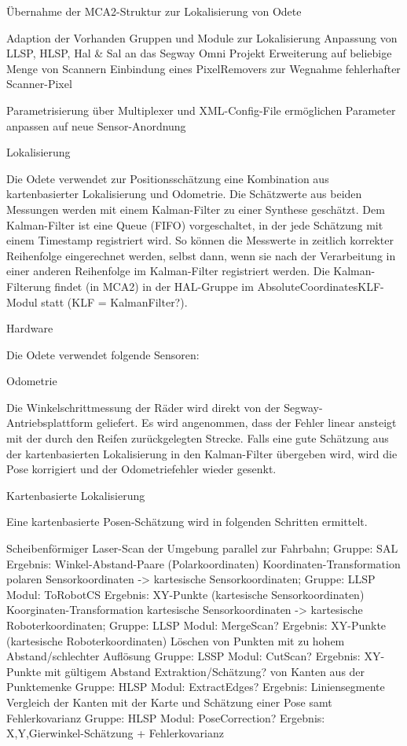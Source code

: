 Übernahme der MCA2-Struktur zur Lokalisierung von Odete

Adaption der Vorhanden Gruppen und Module zur Lokalisierung 
Anpassung von LLSP, HLSP, Hal \& Sal an das Segway Omni Projekt
Erweiterung auf beliebige Menge von Scannern
Einbindung eines PixelRemovers zur Wegnahme fehlerhafter Scanner-Pixel


Parametrisierung über Multiplexer und XML-Config-File ermöglichen
Parameter anpassen auf neue Sensor-Anordnung

Lokalisierung

Die Odete verwendet zur Positionsschätzung eine Kombination aus kartenbasierter Lokalisierung und Odometrie.
 Die Schätzwerte aus beiden Messungen werden mit einem Kalman-Filter zu einer Synthese geschätzt.
 Dem Kalman-Filter ist eine Queue (FIFO) vorgeschaltet, in der jede Schätzung mit einem Timestamp registriert wird.
 So können die Messwerte in zeitlich korrekter Reihenfolge eingerechnet werden, selbst dann, wenn sie nach der
 Verarbeitung in einer anderen Reihenfolge im Kalman-Filter registriert werden.
 Die Kalman-Filterung findet (in MCA2) in der HAL-Gruppe im AbsoluteCoordinatesKLF-Modul statt (KLF = KalmanFilter?). 

Hardware

Die Odete verwendet folgende Sensoren:


Odometrie

Die Winkelschrittmessung der Räder wird direkt von der Segway-Antriebsplattform geliefert.
 Es wird angenommen, dass der Fehler linear ansteigt mit der durch den Reifen zurückgelegten Strecke.
 Falls eine gute Schätzung aus der kartenbasierten Lokalisierung in den Kalman-Filter übergeben wird,
 wird die Pose korrigiert und der Odometriefehler wieder gesenkt.
 
Kartenbasierte Lokalisierung

Eine kartenbasierte Posen-Schätzung wird in folgenden Schritten ermittelt.

    Scheibenförmiger Laser-Scan der Umgebung parallel zur Fahrbahn;
    Gruppe: SAL
    Ergebnis: Winkel-Abstand-Paare (Polarkoordinaten)
    Koordinaten-Transformation polaren Sensorkoordinaten -> kartesische Sensorkoordinaten;
    Gruppe: LLSP
    Modul: ToRobotCS
    Ergebnis: XY-Punkte (kartesische Sensorkoordinaten)
    Koorginaten-Transformation kartesische Sensorkoordinaten -> kartesische Roboterkoordinaten;
    Gruppe: LLSP
    Modul: MergeScan?
    Ergebnis: XY-Punkte (kartesische Roboterkoordinaten)
    Löschen von Punkten mit zu hohem Abstand/schlechter Auflösung
    Gruppe: LSSP
    Modul: CutScan?
    Ergebnis: XY-Punkte mit gültigem Abstand
    Extraktion/Schätzung? von Kanten aus der Punktemenke
    Gruppe: HLSP
    Modul: ExtractEdges?
    Ergebnis: Liniensegmente
    Vergleich der Kanten mit der Karte und Schätzung einer Pose samt Fehlerkovarianz
    Gruppe: HLSP
    Modul: PoseCorrection?
    Ergebnis: X,Y,Gierwinkel-Schätzung + Fehlerkovarianz 

